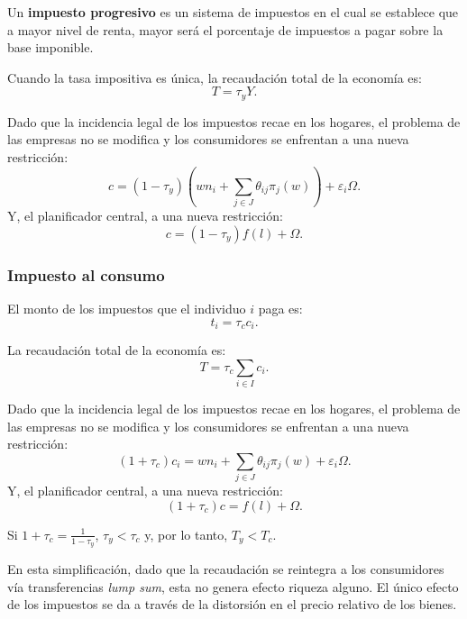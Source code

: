 \documentclass[8pt,a4paper]{extarticle}
\begin{document}
\begin{multicols}{3}
	\begin{boxdef}
		Un \textbf{impuesto progresivo} es un sistema de impuestos en el cual se establece que a mayor nivel de renta, mayor será el porcentaje de impuestos a pagar sobre la base imponible.
	\end{boxdef}

	\begin{boxprop}[]
		Cuando la tasa impositiva es única, la recaudación total de la economía es:
		\[
			T = \tau_y Y
			.\]
	\end{boxprop}

	\begin{boxrmk}[]
		Dado que la incidencia legal de los impuestos recae en los hogares, el problema de las empresas no se modifica y los consumidores se enfrentan a una nueva restricción:
		\[
			c = (1 - \tau_y) \left( wn_i + \sum_{j \in J} \theta_{ij} \pi_j(w) \right) + \varepsilon_i\Omega
			.\]
		Y, el planificador central, a una nueva restricción:
		\[
			c = (1 - \tau_y) f(l) + \Omega
			.\]
	\end{boxrmk}

	\subsubsection{Impuesto al consumo}

	El monto de los impuestos que el individuo $i$ paga es:
	\[
		t_i = \tau_c c_i
		.\]

	\begin{boxprop}[]
		La recaudación total de la economía es:
		\[
			T = \tau_c \sum_{i \in I} c_i
			.\]
	\end{boxprop}

	\begin{boxrmk}[]
		Dado que la incidencia legal de los impuestos recae en los hogares, el problema de las empresas no se modifica y los consumidores se enfrentan a una nueva restricción:
		\[
			(1 + \tau_c)c_i = wn_i + \sum_{j \in J} \theta_{ij}\pi_j(w) + \varepsilon_i\Omega
			.\]
		Y, el planificador central, a una nueva restricción:
		\[
			(1 + \tau_c) c = f(l) + \Omega
			.\]
	\end{boxrmk}

	\begin{boxprop}[]
		Si $\displaystyle 1 + \tau_c = \frac{1}{1 - \tau_y}$, $\tau_y < \tau_c$ y, por lo tanto, $T_y < T_c$.
	\end{boxprop}

	\begin{boxrmk}[]
		En esta simplificación, dado que la recaudación se reintegra a los consumidores vía transferencias \emph{lump sum}, esta no genera efecto riqueza alguno. El único efecto de los impuestos se da a través de la distorsión en el precio relativo de los bienes.
	\end{boxrmk}


\end{multicols}
\end{document}
